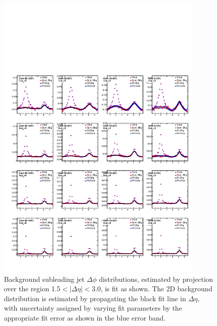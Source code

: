 \begin{figure}[hbtp]
\begin{center}
\includegraphics[width=0.9\textwidth]{figures/Appendices/Fits_PbPb_SubLeading.pdf}
\caption[Subleading jet background fits]{Background subleading jet $\Delta\phi$ distributions, estimated by projection over the region 1.5$<|\Delta\eta|<$3.0, is fit as shown.  The 2D background distribution is estimated by propagating the black fit line in $\Delta\eta$, with uncertainty assigned by varying fit parameters by the appropriate fit error as shown in the blue error band.}
\end{center}
\end{figure}

